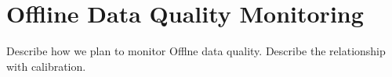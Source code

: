 \section{Offline Data Quality Monitoring}
\label{sec:monitoring}
Describe how we plan to monitor Offlne data quality.  Describe the relationship with calibration.
